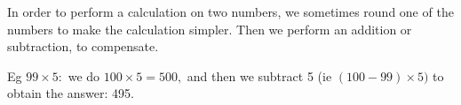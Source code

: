  In order to perform a calculation on two numbers, 
we sometimes round one of the numbers to make the
calculation simpler. Then we perform an addition or 
subtraction, to compensate.
\par
Eg \ensuremath{99 \times 5:} we do \ensuremath{100 \times 5=500,} and then we subtract
5 (ie \ensuremath{(100-99) \times 5)} to obtain the answer: 495.
